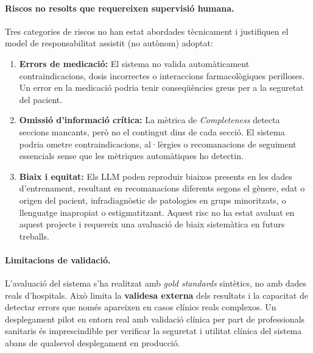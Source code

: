 \documentclass[CAT]{TFUOC}%
\begin{document}
\paragraph{Riscos no resolts que requereixen supervisió humana.}
Tres categories de riscos no han estat abordades tècnicament i justifiquen el model de responsabilitat assistit (no autònom) adoptat:

\begin{enumerate}
    \item \textbf{Errors de medicació:} El sistema no valida automàticament contraindicacions, dosis incorrectes o interaccions farmacològiques perilloses. Un error en la medicació podria tenir conseqüències greus per a la seguretat del pacient.
    
    \item \textbf{Omissió d'informació crítica:} La mètrica de \textit{Completeness} detecta seccions mancants, però no el contingut dins de cada secció. El sistema podria ometre contraindicacions, al·lèrgies o recomanacions de seguiment essencials sense que les mètriques automàtiques ho detectin.
    
    \item \textbf{Biaix i equitat:} Els LLM poden reproduir biaixos presents en les dades d'entrenament, resultant en recomanacions diferents segons el gènere, edat o origen del pacient, infradiagnòstic de patologies en grups minoritzats, o llenguatge inapropiat o estigmatitzant. Aquest risc no ha estat avaluat en aquest projecte i requereix una avaluació de biaix sistemàtica en futurs treballs.
\end{enumerate}

\paragraph{Limitacions de validació.}
L'avaluació del sistema s'ha realitzat amb \textit{gold standards} sintètics, no amb dades reals d'hospitals. Això limita la \textbf{validesa externa} dels resultats i la capacitat de detectar errors que només apareixen en casos clínics reals complexos. Un desplegament pilot en entorn real amb validació clínica per part de professionals sanitaris és imprescindible per verificar la seguretat i utilitat clínica del sistema abans de qualsevol desplegament en producció.

\end{document}
